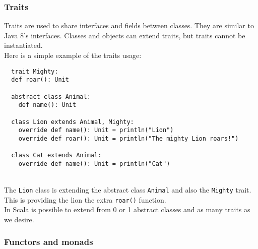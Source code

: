 \subsubsection{Traits}
Traits are used to share interfaces and fields between classes. They are similar to Java 8’s interfaces.
Classes and objects can extend traits, but traits cannot be instantiated.\\
Here is a simple example of the traits usage:
\begin{verbatim}
  trait Mighty:
  def roar(): Unit

  abstract class Animal:
    def name(): Unit

  class Lion extends Animal, Mighty:
    override def name(): Unit = println("Lion")
    override def roar(): Unit = println("The mighty Lion roars!")

  class Cat extends Animal:
    override def name(): Unit = println("Cat")
\end{verbatim}\mbox{}\\
The \texttt{Lion} class is extending the abstract class \texttt{Animal} and also the \texttt{Mighty} trait.
This is providing the lion the extra \texttt{roar()} function.\\
In Scala is possible to extend from 0 or 1 abstract classes and as many traits as we desire.


\subsubsection{Functors and monads}
\label{sssec:functors-monads}
